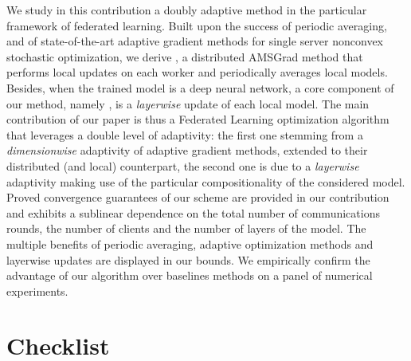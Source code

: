 \documentclass[11pt]{article}
\begin{document}
We study in this contribution a doubly adaptive method in the particular framework of federated learning.
Built upon the success of periodic averaging, and of state-of-the-art adaptive gradient methods for single server nonconvex stochastic optimization, we derive \algo, a distributed AMSGrad method that performs local updates on each worker and periodically averages local models. 
Besides, when the trained model is a deep neural network, a core component of our method, namely \algo, is a \emph{layerwise} update of each local model.
The main contribution of our paper is thus a Federated Learning optimization algorithm that leverages a double level of adaptivity: the first one stemming from a \emph{dimensionwise} adaptivity of adaptive gradient methods, extended to their distributed (and local) counterpart, the second one is due to a  \emph{layerwise} adaptivity making use of the particular compositionality of the considered model.
Proved convergence guarantees of our scheme are provided in our contribution and exhibits a sublinear dependence on the total number of communications rounds, the number of clients and the number of layers of the model.
The multiple benefits of periodic averaging, adaptive optimization methods and layerwise updates are displayed in our bounds.
We empirically confirm the advantage of our algorithm over baselines methods on a panel of numerical experiments.


\clearpage







\clearpage


\section*{Checklist}
\end{document}
